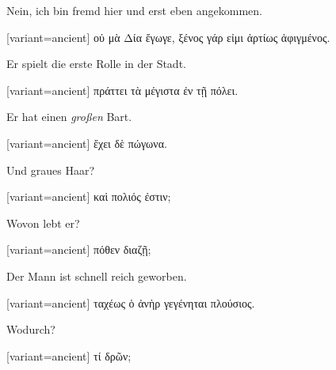 Nein, ich bin fremd hier und erst eben angekommen. 

\switchcolumn

\begin{greek}[variant=ancient]%
οὐ μὰ Δία ἔγωγε, ξένος γάρ εἰμι ἀρτίως ἀφιγμένος.

\end{greek}%
\switchcolumn*

Er spielt die erste Rolle in der Stadt. 

\switchcolumn

\begin{greek}[variant=ancient]%
πράττει τὰ μέγιστα ἐν τῇ πόλει.

\end{greek}%
\switchcolumn*

Er hat einen \emph{großen} Bart. 

\switchcolumn

\begin{greek}[variant=ancient]%
ἔχει δὲ πώγωνα.

\end{greek}%
\switchcolumn*

Und graues Haar? 

\switchcolumn

\begin{greek}[variant=ancient]%
καὶ πολιός ἐστιν;

\end{greek}%
\switchcolumn*

Wovon lebt er? 

\switchcolumn

\begin{greek}[variant=ancient]%
πόθεν διαζῇ;

\end{greek}%
\switchcolumn*

Der Mann ist schnell reich geworben. 

\switchcolumn

\begin{greek}[variant=ancient]%
ταχέως ὁ ἀνὴρ γεγένηται πλούσιος.

\end{greek}%
\switchcolumn*

Wodurch? 

\switchcolumn

\begin{greek}[variant=ancient]%
τί δρῶν;

\end{greek}%
\switchcolumn*

